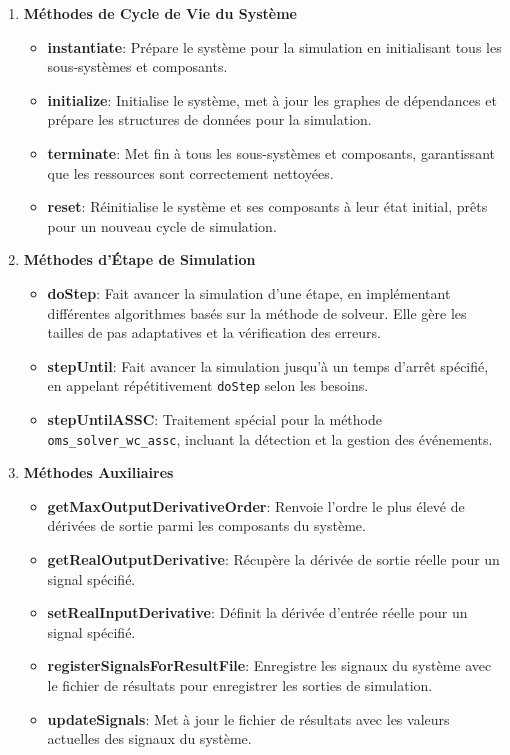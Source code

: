 \begin{enumerate}
    \item \textbf{Méthodes de Cycle de Vie du Système}
    \begin{itemize}
        \item \textbf{instantiate}: Prépare le système pour la simulation en initialisant tous les sous-systèmes et composants.
        \item \textbf{initialize}: Initialise le système, met à jour les graphes de dépendances et prépare les structures de données pour la simulation.
        \item \textbf{terminate}: Met fin à tous les sous-systèmes et composants, garantissant que les ressources sont correctement nettoyées.
        \item \textbf{reset}: Réinitialise le système et ses composants à leur état initial, prêts pour un nouveau cycle de simulation.
    \end{itemize}

    \item \textbf{Méthodes d'Étape de Simulation}
    \begin{itemize}
        \item \textbf{doStep}: Fait avancer la simulation d'une étape, en implémentant différentes algorithmes basés sur la méthode de solveur. Elle gère les tailles de pas adaptatives et la vérification des erreurs.
        \item \textbf{stepUntil}: Fait avancer la simulation jusqu'à un temps d'arrêt spécifié, en appelant répétitivement \texttt{doStep} selon les besoins.
        \item \textbf{stepUntilASSC}: Traitement spécial pour la méthode \texttt{oms\_solver\_wc\_assc}, incluant la détection et la gestion des événements.
    \end{itemize}

    \item \textbf{Méthodes Auxiliaires}
    \begin{itemize}
        \item \textbf{getMaxOutputDerivativeOrder}: Renvoie l'ordre le plus élevé de dérivées de sortie parmi les composants du système.
        \item \textbf{getRealOutputDerivative}: Récupère la dérivée de sortie réelle pour un signal spécifié.
        \item \textbf{setRealInputDerivative}: Définit la dérivée d'entrée réelle pour un signal spécifié.
        \item \textbf{registerSignalsForResultFile}: Enregistre les signaux du système avec le fichier de résultats pour enregistrer les sorties de simulation.
        \item \textbf{updateSignals}: Met à jour le fichier de résultats avec les valeurs actuelles des signaux du système.
    \end{itemize}


\end{enumerate}
